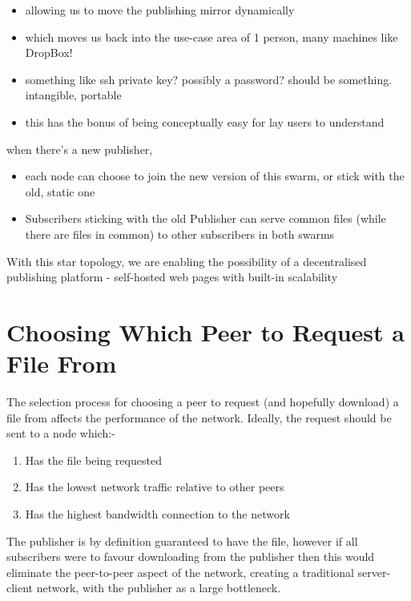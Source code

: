 \documentclass[12pt,a4paper,]{adreport}
\begin{document}
\begin{itemize}
\itemsep1pt\parskip0pt
\item
  allowing us to move the publishing mirror dynamically
\item
  which moves us back into the use-case area of 1 person, many machines
  like DropBox!
\item
  something like ssh private key? possibly a password? should be
  something. intangible, portable
\item
  this has the bonus of being conceptually easy for lay users to
  understand
\end{itemize}

when there's a new publisher,

\begin{itemize}
\itemsep1pt\parskip0pt
\item
  each node can choose to join the new version of this swarm, or stick
  with the old, static one
\item
  Subscribers sticking with the old Publisher can serve common files
  (while there are files in common) to other subscribers in both swarms
\end{itemize}

With this star topology, we are enabling the possibility of a
decentralised publishing platform - self-hosted web pages with built-in
scalability

\section{Choosing Which Peer to Request a File
From}\label{choosing-which-peer-to-request-a-file-from}

The selection process for choosing a peer to request (and hopefully
download) a file from affects the performance of the network. Ideally,
the request should be sent to a node which:-

\begin{enumerate}
\def\labelenumi{\arabic{enumi}.}
\itemsep1pt\parskip0pt
\item
  Has the file being requested
\item
  Has the lowest network traffic relative to other peers
\item
  Has the highest bandwidth connection to the network
\end{enumerate}

The publisher is by definition guaranteed to have the file, however if
all subscribers were to favour downloading from the publisher then this
would eliminate the peer-to-peer aspect of the network, creating a
traditional server-client network, with the publisher as a large
bottleneck.
\end{document}
